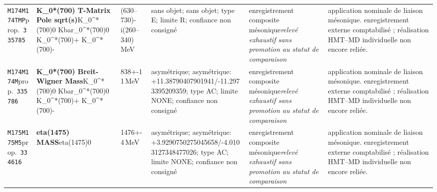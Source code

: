 \begin{landscape}
\begin{longtable}{L{1.85cm}L{4.45cm}L{2.35cm}L{4.05cm}L{3.35cm}L{7.15cm}}
\texttt{M174}\newline \texttt{M174TMP}\newline prop.\ \texttt{335785} & \textbf{K\_\allowbreak{}0*(700) T-Matrix Pole sqrt(s)}\newline K\_\allowbreak{}0\textasciicircum{}*(700)0 \textbar{}\allowbreak{} Kbar\_\allowbreak{}0\textasciicircum{}*(700)0 \textbar{}\allowbreak{} K\_\allowbreak{}0\textasciicircum{}*(700)+ \textbar{}\allowbreak{} K\_\allowbreak{}0\textasciicircum{}*(700)- & (630--730)-i(260--340)\,MeV & sans objet; sans objet; type E; limite R; confiance non consigné & enregistrement composite mésonique\newline \emph{relevé exhaustif sans promotion au statut de comparaison} & application nominale de liaison mésonique. enregistrement externe comptabilisé ; réalisation HMT--MD individuelle non encore reliée. \\
\texttt{M174}\newline \texttt{M174M}\newline prop.\ \texttt{335786} & \textbf{K\_\allowbreak{}0*(700) Breit-Wigner Mass}\newline K\_\allowbreak{}0\textasciicircum{}*(700)0 \textbar{}\allowbreak{} Kbar\_\allowbreak{}0\textasciicircum{}*(700)0 \textbar{}\allowbreak{} K\_\allowbreak{}0\textasciicircum{}*(700)+ \textbar{}\allowbreak{} K\_\allowbreak{}0\textasciicircum{}*(700)- & 838+-11\,MeV & asymétrique; asymétrique: +11.38790407901941/-11.2973395209359; type AC; limite NONE; confiance non consigné & enregistrement composite mésonique\newline \emph{relevé exhaustif sans promotion au statut de comparaison} & application nominale de liaison mésonique. enregistrement externe comptabilisé ; réalisation HMT--MD individuelle non encore reliée. \\
\texttt{M175}\newline \texttt{M175M5}\newline prop.\ \texttt{334616} & \textbf{eta(1475) MASS}\newline eta(1475)0 & 1476+-4\,MeV & asymétrique; asymétrique: +3.9290750275045658/-4.0103127348477026; type AC; limite NONE; confiance non consigné & enregistrement composite mésonique\newline \emph{relevé exhaustif sans promotion au statut de comparaison} & application nominale de liaison mésonique. enregistrement externe comptabilisé ; réalisation HMT--MD individuelle non encore reliée. \\

\end{longtable}
\end{landscape}
